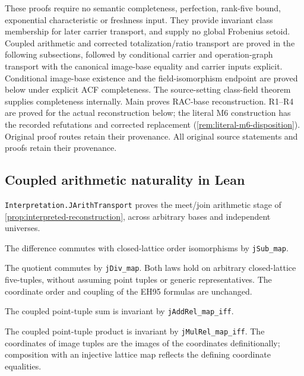 \documentclass[11pt,oneside]{article}
\theoremstyle{definition}
\theoremstyle{remark}
\newcommand{\lean}[1]{\nolinkurl{#1}}
\begin{document}
These proofs require no semantic completeness, perfection, rank-five bound,
exponential characteristic or freshness input. They provide invariant class membership
for later carrier transport, and supply no global Frobenius setoid.
Coupled arithmetic and corrected totalization/ratio transport are proved in the
following subsections, followed by conditional carrier and operation-graph transport
with the canonical image-base equality and carrier inputs explicit. Conditional image-base
existence and the field-isomorphism endpoint are proved below under explicit ACF completeness.
The source-setting class-field theorem supplies completeness internally. Main proves
RAC-base reconstruction. R1--R4 are proved for the actual reconstruction below; the
literal M6 construction has the recorded refutations and corrected replacement
(\cref{rem:literal-m6-disposition}). Original proof routes retain their provenance.
All original source statements and proofs retain their provenance.

\subsection{Coupled arithmetic naturality in Lean}

\lean{Interpretation.JArithTransport} proves the meet/join arithmetic stage of
\cref{prop:interpreted-reconstruction}, across arbitrary bases and independent universes.

The difference commutes with closed-lattice order isomorphisms by \lean{jSub_map}.

The quotient commutes by \lean{jDiv_map}. Both laws hold on arbitrary closed-lattice
five-tuples, without assuming point tuples or generic representatives.
The coordinate order and coupling of the EH95 formulas are unchanged.

The coupled point-tuple sum is invariant by \lean{jAddRel_map_iff}.

The coupled point-tuple product is invariant by \lean{jMulRel_map_iff}.
The coordinates of image tuples are the images of the coordinates definitionally;
composition with an injective lattice map reflects the defining coordinate equalities.
\end{document}
